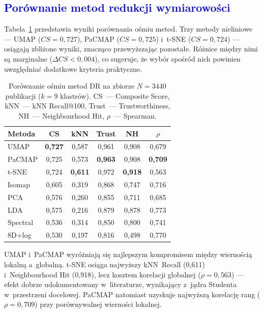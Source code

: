 \documentclass[a4paper,11pt,twocolumn]{article}
\newcommand{\hl}[1]{\textcolor{blue}{#1}}
\begin{document}
\subsection{\hl{Porównanie metod redukcji wymiarowości}}

Tabela~\ref{tab:dr} przedstawia wyniki porównania ośmiu metod.
Trzy metody nieliniowe --- UMAP ($CS=0{,}727$), PaCMAP ($CS=0{,}725$)
i~t-SNE ($CS=0{,}724$) --- osiągają zbliżone wyniki, znacząco
przewyższając pozostałe. Różnice między nimi są marginalne
($\Delta CS < 0{,}004$), co sugeruje, że wybór spośród nich powinien
uwzględniać dodatkowe kryteria praktyczne.

\begin{table}[t]
\centering
\caption{Porównanie ośmiu metod DR na zbiorze $N=3440$ publikacji
($k=9$ klastrów). CS~--- Composite Score,
kNN~--- kNN Recall@100, Trust~--- Trustworthiness,
NH~--- Neighbourhood Hit, $\rho$~--- Spearman.}
\label{tab:dr}
\small
\setlength{\tabcolsep}{3pt}
\begin{tabular}{@{}lccccc@{}}
\toprule
Metoda & CS & kNN & Trust & NH & $\rho$ \\
\midrule
UMAP      & \textbf{0,727} & 0,587 & 0,961 & 0,908 & 0,679 \\
PaCMAP    & 0,725 & 0,573 & \textbf{0,963} & 0,908 & \textbf{0,709} \\
t-SNE     & 0,724 & \textbf{0,611} & 0,972 & \textbf{0,918} & 0,563 \\
Isomap    & 0,605 & 0,319 & 0,868 & 0,747 & 0,716 \\
PCA       & 0,576 & 0,260 & 0,855 & 0,711 & 0,685 \\
LDA       & 0,575 & 0,216 & 0,879 & 0,878 & 0,773 \\
Spectral  & 0,536 & 0,314 & 0,850 & 0,800 & 0,741 \\
8D+log    & 0,530 & 0,197 & 0,816 & 0,498 & 0,770 \\
\bottomrule
\end{tabular}
\end{table}

UMAP i~PaCMAP wyróżniają się najlepszym kompromisem między wiernością
lokalną a~globalną. t-SNE osiąga najwyższy kNN~Recall (0,611)
i~Neighbourhood Hit (0,918), lecz kosztem korelacji globalnej
($\rho=0{,}563$) --- efekt dobrze udokumentowany w~literaturze,
wynikający z~jądra Studenta w~przestrzeni docelowej. PaCMAP natomiast
uzyskuje najwyższą korelację rang ($\rho=0{,}709$) przy porównywalnej
wierności lokalnej.
\end{document}

